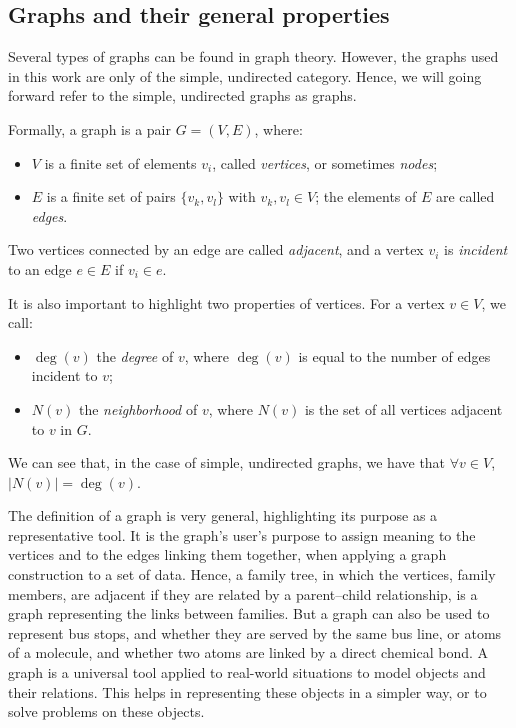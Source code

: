 \documentclass{mimosis}
\begin{document}
\subsection{Graphs and their general properties}

Several types of graphs can be found in graph theory. However, the graphs used in this work are only of the simple, undirected category. Hence, we will going forward refer to the simple, undirected graphs as graphs.

Formally, a graph is a pair \( G = (V, E) \), where:

\begin{itemize}
    \item \( V \) is a finite set of elements \( v_i \), called \emph{vertices}, or sometimes \emph{nodes};
    \item \( E \) is a finite set of pairs \( \{v_k, v_l\} \) with \( v_k, v_l \in V \); the elements of \( E \) are called \emph{edges}.
\end{itemize}

Two vertices connected by an edge are called \emph{adjacent}, and a vertex \( v_i \) is \emph{incident} to an edge \( e \in E \) if \( v_i \in e \).

It is also important to highlight two properties of vertices. For a vertex \( v \in V \), we call:

\begin{itemize}
    \item \( \deg(v) \) the \emph{degree} of \( v \), where \( \deg(v) \) is equal to the number of edges incident to \( v \);
    \item \( N(v) \) the \emph{neighborhood} of \( v \), where \( N(v) \) is the set of all vertices adjacent to \( v \) in \( G \).
\end{itemize}

We can see that, in the case of simple, undirected graphs, we have that \(\forall v \in V \), \( |N(v)| = \deg(v) \).

The definition of a graph is very general, highlighting its purpose as a representative tool. It is the graph's user's purpose to assign meaning to the vertices and to the edges linking them together, when applying a graph construction to a set of data. Hence, a family tree, in which the vertices, family members, are adjacent if they are related by a parent–child relationship, is a graph representing the links between families. But a graph can also be used to represent bus stops, and whether they are served by the same bus line, or atoms of a molecule, and whether two atoms are linked by a direct chemical bond. A graph is a universal tool applied to real-world situations to model objects and their relations. This helps in representing these objects in a simpler way, or to solve problems on these objects.
\end{document}
